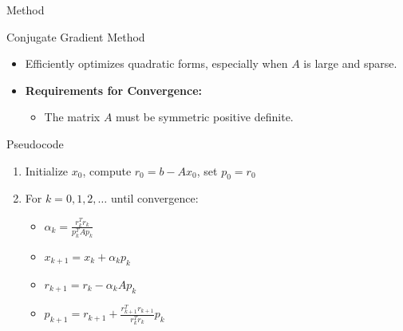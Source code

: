 \documentclass{beamer}
\begin{document}
\begin{frame}{Method}
  \footnotesize 

  \begin{block}{Conjugate Gradient Method}
    \begin{itemize}
      \item Efficiently optimizes quadratic forms, especially when \( A \) is large and sparse.
      \item \textbf{Requirements for Convergence:}
      \begin{itemize}
        \item The matrix \( A \) must be symmetric positive definite.
      \end{itemize}
    \end{itemize}
  \end{block}

  \begin{block}{Pseudocode}
    \begin{enumerate}
      \item Initialize \( x_0 \), compute \( r_0 = b - Ax_0 \), set \( p_0 = r_0 \)
      \item For \( k = 0, 1, 2, \ldots \) until convergence:
      \begin{itemize}
        \item \( \alpha_k = \frac{r_k^T r_k}{p_k^T A p_k} \)
        \item \( x_{k+1} = x_k + \alpha_k p_k \)
        \item \( r_{k+1} = r_k - \alpha_k Ap_k \)
        \item \( p_{k+1} = r_{k+1} + \frac{r_{k+1}^T r_{k+1}}{r_k^T r_k} p_k \)
      \end{itemize}
    \end{enumerate}
  \end{block}
\end{frame}
\end{document}
